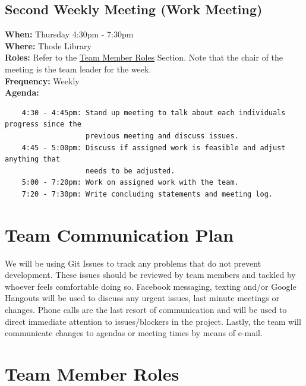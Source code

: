 \documentclass{article}
\begin{document}
\subsection{Second Weekly Meeting (Work Meeting)}
\textbf{When:} Thursday 4:30pm - 7:30pm\\
\textbf{Where:} Thode Library\\
\textbf{Roles:} Refer to the \hyperref[TeamMemberRoles]{Team Member Roles} Section. Note that the chair of the meeting is the team leader for the week. \\
\textbf{Frequency:} Weekly\\
\textbf{Agenda:}
\begin{verbatim}
    4:30 - 4:45pm: Stand up meeting to talk about each individuals progress since the
                   previous meeting and discuss issues.
    4:45 - 5:00pm: Discuss if assigned work is feasible and adjust anything that
                   needs to be adjusted. 
    5:00 - 7:20pm: Work on assigned work with the team.  
    7:20 - 7:30pm: Write concluding statements and meeting log.  
\end{verbatim}


\section{Team Communication Plan}
We will be using Git Issues to track any problems that do not prevent development. These issues should be reviewed by team members and tackled by whoever feels comfortable doing so. Facebook messaging, texting and/or Google Hangouts will be used to discuss any urgent issues, last minute meetings or changes. Phone calls are the last resort of communication and will be used to direct immediate attention to issues/blockers in the project. Lastly, the team will communicate changes to agendas or meeting times by means of e-mail.

\section{Team Member Roles}
\end{document}
